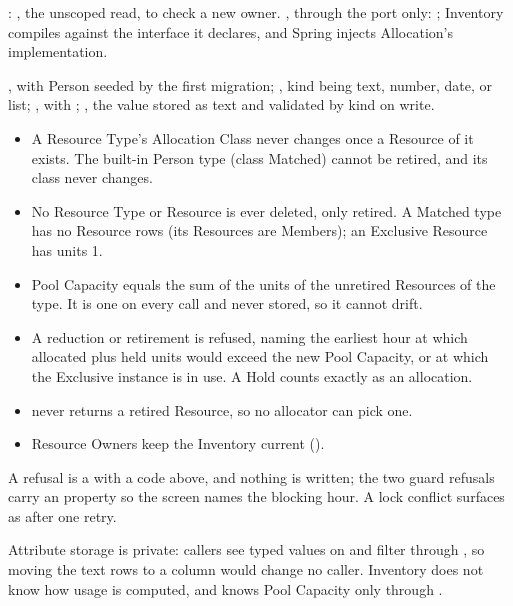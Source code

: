 : , the unscoped read, to check a new owner. , through the port only: ; Inventory compiles against the interface it declares, and Spring injects Allocation's implementation.

{\raggedright{}, with Person seeded by the first migration; , kind being text, number, date, or list; , with ; , the value stored as text and validated by kind on write.\par}

\begin{itemize}
\item A Resource Type's Allocation Class never changes once a Resource of it exists. The built-in Person type (class Matched) cannot be retired, and its class never changes.
\item No Resource Type or Resource is ever deleted, only retired. A Matched type has no Resource rows (its Resources are Members); an Exclusive Resource has units 1.
\item Pool Capacity equals the sum of the units of the unretired Resources of the type. It is one  on every call and never stored, so it cannot drift.
\item A reduction or retirement is refused, naming the earliest hour at which allocated plus held units would exceed the new Pool Capacity, or at which the Exclusive instance is in use. A Hold counts exactly as an allocation.
\item {} never returns a retired Resource, so no allocator can pick one.
\item Resource Owners keep the Inventory current ().
\end{itemize}

A refusal is a  with a code above, and nothing is written; the two guard refusals carry an  property so the screen names the blocking hour. A lock conflict surfaces as  after one retry.

Attribute storage is private: callers see typed values on  and filter through , so moving the text rows to a  column would change no caller. Inventory does not know how usage is computed, and  knows Pool Capacity only through .

